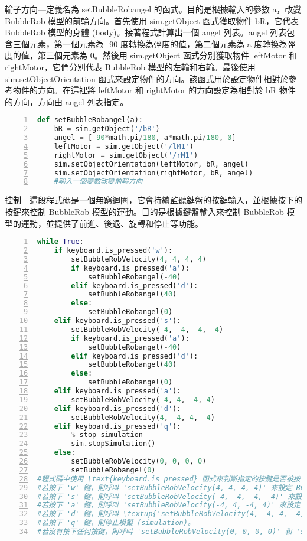輪子方向---定義名為 setBubbleRobangel 的函式。目的是根據輸入的參數 a，改變 BubbleRob 模型的前輪方向。首先使用 sim.getObject 函式獲取物件 bR，它代表 BubbleRob 模型的身體 (body)。接著程式計算出一個 angel 列表。angel 列表包含三個元素，第一個元素為 -90 度轉換為弳度的值，第二個元素為 a 度轉換為弳度的值，第三個元素為 0。然後用 sim.getObject 函式分別獲取物件 leftMotor 和 rightMotor，它們分別代表 BubbleRob 模型的左輪和右輪。最後使用 sim.setObjectOrientation 函式來設定物件的方向。該函式用於設定物件相對於參考物件的方向。在這裡將 leftMotor 和 rightMotor 的方向設定為相對於 bR 物件的方向，方向由 angel 列表指定。
\begin{lstlisting}[language=Python, frame=single, numbers=left, captionpos=b, basicstyle=\ttfamily\small,showstringspaces=false, breaklines=true, tabsize=4, xleftmargin=15pt]
def setBubbleRobangel(a):
    bR = sim.getObject('/bR')
    angel = [-90*math.pi/180, a*math.pi/180, 0]
    leftMotor = sim.getObject('/lM1')
    rightMotor = sim.getObject('/rM1')
    sim.setObjectOrientation(leftMotor, bR, angel)
    sim.setObjectOrientation(rightMotor, bR, angel)
    #輸入一個變數改變前輪方向
\end{lstlisting}

\newpage

控制---這段程式碼是一個無窮迴圈，它會持續監聽鍵盤的按鍵輸入，並根據按下的按鍵來控制 BubbleRob 模型的運動。目的是根據鍵盤輸入來控制 BubbleRob 模型的運動，並提供了前進、後退、旋轉和停止等功能。
\begin{lstlisting}[language=Python, frame=single, numbers=left, captionpos=b, basicstyle=\ttfamily\small,showstringspaces=false, breaklines=true, tabsize=4, xleftmargin=15pt]
while True:
    if keyboard.is_pressed('w'):
        setBubbleRobVelocity(4, 4, 4, 4)
        if keyboard.is_pressed('a'):
            setBubbleRobangel(-40)
        elif keyboard.is_pressed('d'):
            setBubbleRobangel(40)
        else:
            setBubbleRobangel(0)
    elif keyboard.is_pressed('s'):
        setBubbleRobVelocity(-4, -4, -4, -4)
        if keyboard.is_pressed('a'):
            setBubbleRobangel(-40)
        elif keyboard.is_pressed('d'):
            setBubbleRobangel(40)
        else:
            setBubbleRobangel(0)
    elif keyboard.is_pressed('a'):
        setBubbleRobVelocity(-4, 4, -4, 4)
    elif keyboard.is_pressed('d'):
        setBubbleRobVelocity(4, -4, 4, -4)
    elif keyboard.is_pressed('q'):
        % stop simulation
        sim.stopSimulation()
    else:
        setBubbleRobVelocity(0, 0, 0, 0)
        setBubbleRobangel(0)
#程式碼中使用 \text{keyboard.is_pressed} 函式來判斷指定的按鍵是否被按下。
#若按下 'w' 鍵，則呼叫 'setBubbleRobVelocity(4, 4, 4, 4)' 來設定 BubbleRob 模型的速度為正向，並根據 'a' 和 'd' 鍵的狀態設定前輪的方向。
#若按下 's' 鍵，則呼叫 'setBubbleRobVelocity(-4, -4, -4, -4)' 來設定 BubbleRob 模型的速度為負向，並根據 'a' 和 'd' 鍵的狀態設定前輪的方向。
#若按下 'a' 鍵，則呼叫 'setBubbleRobVelocity(-4, 4, -4, 4)' 來設定 BubbleRob 模型的速度使其向左旋轉。
#若按下 'd' 鍵，則呼叫 \textup{'setBubbleRobVelocity(4, -4, 4, -4)'} 來設定 BubbleRob 模型的速度使其向右旋轉。
#若按下 'q' 鍵，則停止模擬 (simulation)。
#若沒有按下任何按鍵，則呼叫 'setBubbleRobVelocity(0, 0, 0, 0)' 和 'setBubbleRobangel(0)'，將 BubbleRob 模型的速度和前輪方向設定為零，即停止移動。
\end{lstlisting}
\newpage
